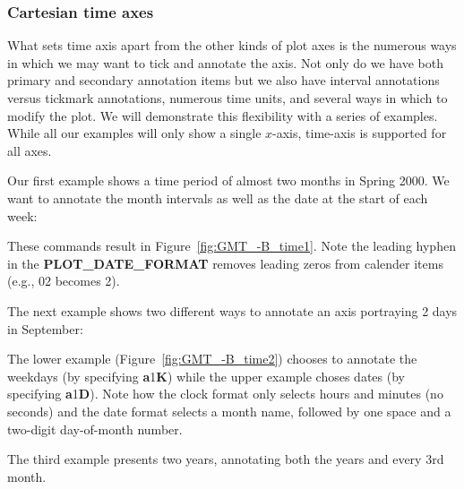 
\subsubsection{Cartesian time axes}

What sets time axis apart from the other kinds of plot axes is the numerous ways in which we
may want to tick and annotate the axis.  Not only do we have both primary and secondary annotation
items but we also have interval annotations versus tickmark annotations, numerous time units,
and several ways in which to modify the plot.  We will demonstrate this flexibility with a
series of examples.  While all our examples will only show a single $x$-axis, time-axis is supported for all axes.

Our first example shows a time period of almost two months in Spring 2000.  We want to annotate the month
intervals as well as the date at the start of each week:



These commands result in Figure~\ref{fig:GMT_-B_time1}.  Note the leading hyphen in the \textbf{PLOT\_DATE\_FORMAT}
removes leading zeros from calender items (e.g., 02 becomes 2).

The next example shows two different ways to annotate an axis portraying 2 days in September:



The lower example (Figure~\ref{fig:GMT_-B_time2}) chooses to annotate the weekdays (by specifying
\textbf{a}1\textbf{K}) while the upper
example choses dates (by specifying \textbf{a}1\textbf{D}).  Note how the clock format only selects hours and minutes (no seconds) and
the date format selects a month name, followed by one space and a two-digit day-of-month number.


The third example presents two years, annotating both the years and every 3rd month.

